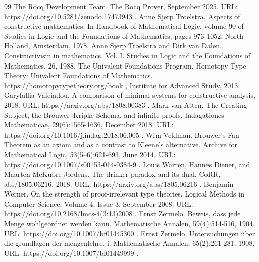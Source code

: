 \begin{thebibliography}{99}
 The Rocq Development Team. The Rocq Prover, September 2025. URL: https://doi.org/10.5281/zenodo.17473943 .
 Anne Sjerp Troelstra. Aspects of constructive mathematics. In Handbook of Mathematical Logic, volume 90 of Studies in Logic and the Foundations of Mathematics, pages 973-1052. North-Holland, Amsterdam, 1978.
 Anne Sjerp Troelstra and Dirk van Dalen. Constructivism in mathematics. Vol. I. Studies in Logic and the Foundations of Mathematics, 26, 1988.
 The Univalent Foundations Program. Homotopy Type Theory: Univalent Foundations of Mathematics. https://homotopytypetheory.org/book , Institute for Advanced Study, 2013.
 Garyfallia Vafeiadou. A comparison of minimal systems for constructive analysis, 2018. URL: https://arxiv.org/abs/1808.00383 .
 Mark van Atten. The Creating Subject, the Brouwer–Kripke Schema, and infinite proofs. Indagationes Mathematicae, 29(6):1565-1636, December 2018. URL: https://doi.org/10.1016/j.indag.2018.06.005 .
 Wim Veldman. Brouwer’s Fan Theorem as an axiom and as a contrast to Kleene’s alternative. Archive for Mathematical Logic, 53(5–6):621-693, June 2014. URL: https://doi.org/10.1007/s00153-014-0384-9 .
 Louis Warren, Hannes Diener, and Maarten McKubre-Jordens. The drinker paradox and its dual. CoRR, abs/1805.06216, 2018. URL: https://arxiv.org/abs/1805.06216 .
 Benjamin Werner. On the strength of proof-irrelevant type theories. Logical Methods in Computer Science, Volume 4, Issue 3, September 2008. URL: https://doi.org/10.2168/lmcs-4(3:13)2008 .
 Ernst Zermelo. Beweis, dass jede Menge wohlgeordnet werden kann. Mathematische Annalen, 59(4):514-516, 1904. URL: https://doi.org/10.1007/bf01445300 .
 Ernst Zermelo. Untersuchungen über die grundlagen der mengenlehre. i. Mathematische Annalen, 65(2):261-281, 1908. URL: https://doi.org/10.1007/bf01449999 .
\end{thebibliography}
